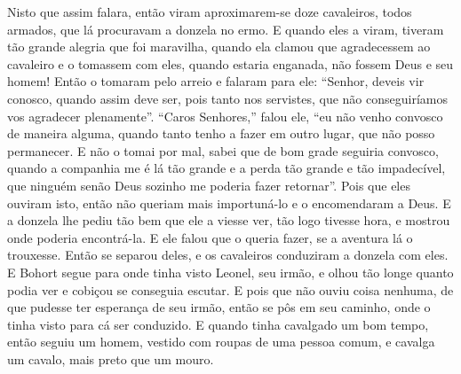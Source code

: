  Nisto que assim falara, então viram aproximarem-se doze cavaleiros, todos
armados, que lá procuravam a donzela no ermo. E quando eles a viram, tiveram
tão grande alegria que foi maravilha, quando ela clamou que agradecessem ao
cavaleiro e o tomassem com eles, quando estaria enganada, não fossem Deus e seu
homem! Então o tomaram pelo arreio e falaram para ele: “Senhor, deveis vir
conosco, quando assim deve ser, pois tanto nos servistes, que não
conseguiríamos vos agradecer plenamente”. “Caros Senhores,” falou ele, “eu não
venho convosco de maneira alguma, quando tanto tenho a fazer em outro lugar,
que não posso permanecer. E não o tomai por mal, sabei que de bom grade
seguiria convosco, quando a companhia me é lá tão grande e a perda tão grande e
tão impadecível, que ninguém senão Deus sozinho me poderia fazer retornar”.
Pois que eles ouviram isto, então não queriam mais importuná-lo e o
encomendaram a Deus. E a donzela lhe pediu tão bem que ele a
viesse ver, tão logo tivesse hora, e mostrou onde poderia encontrá-la. E ele
falou que o queria fazer, se a aventura lá o trouxesse. Então se separou deles,
e os cavaleiros conduziram  a donzela com eles. E Bohort segue para onde tinha
visto Leonel, seu irmão, e olhou tão longe quanto podia ver e cobiçou se
conseguia escutar. E pois que não ouviu coisa nenhuma, de que pudesse ter
esperança de seu irmão, então se pôs em seu caminho, onde o tinha visto para cá
ser conduzido. E quando tinha cavalgado um bom tempo, então seguiu um homem,
vestido com roupas de uma pessoa comum, e cavalga um cavalo, mais preto que um
mouro. 

